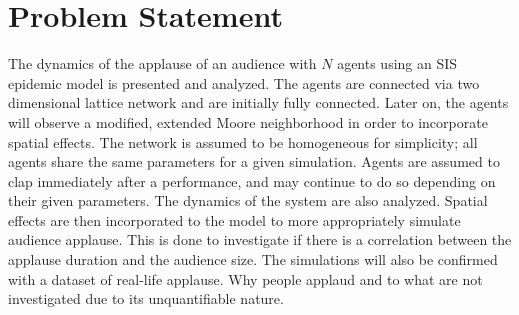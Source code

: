 \section{Problem Statement}

The dynamics of the applause of an audience with $N$ agents using an SIS epidemic model is presented and analyzed. 
The agents are connected via two dimensional lattice network and are initially fully connected.
Later on, the agents will observe a modified, extended Moore neighborhood in order to incorporate spatial effects.
The network is assumed to be homogeneous for simplicity; all agents share the same parameters for a given simulation.
Agents are assumed to clap immediately after a performance, and may continue to do so depending on their given parameters.
The dynamics of the system are also analyzed.
Spatial effects are then incorporated to the model to more appropriately simulate audience applause.
This is done to investigate if there is a correlation between the applause duration and the audience size.
The simulations will also be confirmed with a dataset of real-life applause.
Why people applaud and to what are not investigated due to its unquantifiable nature.

  






